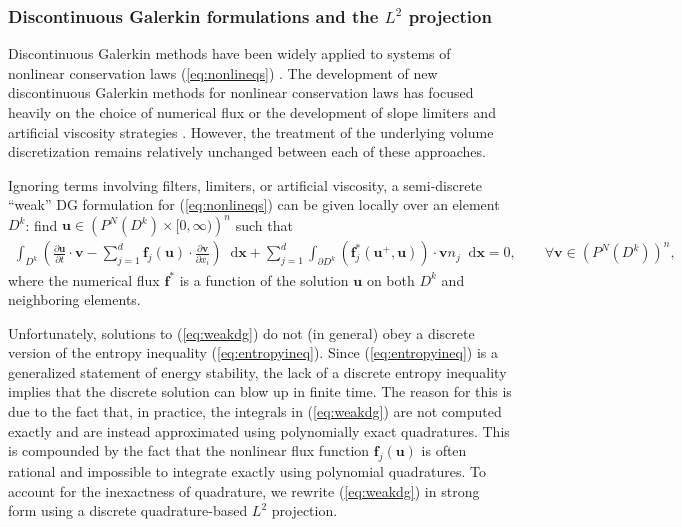 \documentclass[preprint,10pt]{article}
\theoremstyle{definition}
\theoremstyle{lemma}
\theoremstyle{theorem}
\theoremstyle{assumption}
\newcommand{\pd}[2]{\frac{\partial#1}{\partial#2}}
\newcommand{\LRp}[1]{\left( #1 \right)}
\newcommand*\diff[1]{\mathop{}\!{\mathrm{d}#1}} %
\begin{document}
\subsubsection{Discontinuous Galerkin formulations and the $L^2$ projection}

Discontinuous Galerkin methods have been widely applied to systems of nonlinear conservation laws (\ref{eq:nonlineqs}) \cite{cockburn1989tvb, cockburn1998runge, cockburn2001devising, karniadakis2013spectral}.  The development of new discontinuous Galerkin methods for nonlinear conservation laws has focused heavily on the choice of numerical flux \cite{qiu2006numerical} or the development of  slope limiters \cite{krivodonova2007limiters, zhang2012maximum, dumbser2014posteriori} and artificial viscosity strategies \cite{persson2006sub, barter2010shock, klockner2011viscous}.  However, the treatment of the underlying volume discretization remains relatively unchanged between each of these approaches.  

Ignoring terms involving filters, limiters, or artificial viscosity, a semi-discrete ``weak'' DG formulation  for (\ref{eq:nonlineqs}) can be given locally over an element $D^k$: find $\bm{u}\in \LRp{P^N\LRp{D^k} \times [0,\infty)}^n$ such that
\begin{align}
\int_{D^k} \LRp{\pd{\bm{u}}{t}\cdot \bm{v} - \sum_{j=1}^d\bm{f}_j(\bm{u}) \cdot \pd{\bm{v}}{x_i}} \diff{\bm{x}} 
+ \sum_{j=1}^d \int_{\partial D^k} \LRp{\bm{f}^*_j\LRp{\bm{u}^+,\bm{u}} }\cdot \bm{v} n_j  \diff{\bm{x}} = 0, \qquad \forall \bm{v}\in \LRp{P^N\LRp{D^k}}^n,
\label{eq:weakdg}
\end{align}
where the numerical flux $\bm{f}^*$ is a function of the solution $\bm{u}$ on both $D^k$ and neighboring elements.  

Unfortunately, solutions to (\ref{eq:weakdg}) do not (in general) obey a discrete version of the entropy inequality (\ref{eq:entropyineq}).  Since (\ref{eq:entropyineq}) is a generalized statement of energy stability, the lack of a discrete entropy inequality implies that the discrete solution can blow up in finite time.  The reason for this is due to the fact that, in practice, the integrals in (\ref{eq:weakdg}) are not computed exactly and are instead approximated using polynomially exact quadratures.  This is compounded by the fact that the nonlinear flux  function $\bm{f}_j\LRp{\bm{u}}$ is often rational and impossible to integrate exactly using polynomial quadratures.  To account for the inexactness of quadrature, we rewrite (\ref{eq:weakdg}) in strong form using a discrete quadrature-based $L^2$ projection.  
\end{document}
